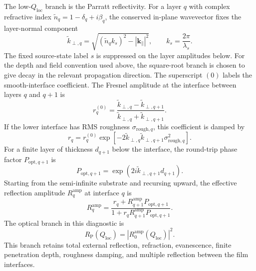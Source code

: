 The low-$Q_{\mathrm{loc}}$ branch is the Parratt reflectivity.\cite{Parratt1954} For a layer
$q$ with complex refractive index $\tilde n_q=1-\delta_q+i\beta_q$, the conserved
in-plane wavevector fixes the layer-normal component
\begin{equation}
  \widetilde k_{\perp,q}=\sqrt{(\tilde n_q k_s)^2-\left|\mathbf k_{\parallel}\right|^2},
  \qquad
  k_s=\frac{2\pi}{\lambda_s}.
  \label{eq:si_parratt_kz}
\end{equation}
The fixed source-state label $s$ is suppressed on the layer amplitudes below. For the depth and field convention used above, the square-root branch is chosen
to give decay in the relevant propagation direction.
The superscript $(0)$ labels the smooth-interface coefficient. The Fresnel amplitude at the interface between layers $q$ and $q+1$ is
\begin{equation}
  r_q^{(0)}=\frac{\widetilde k_{\perp,q}-\widetilde k_{\perp,q+1}}{\widetilde k_{\perp,q}+\widetilde k_{\perp,q+1}}.
  \label{eq:si_parratt_interface}
\end{equation}
If the lower interface has RMS roughness $\sigma_{\mathrm{rough},q}$, this coefficient is damped
by
\begin{equation}
  r_q=r_q^{(0)}\exp\!\left[-2\widetilde k_{\perp,q}\widetilde k_{\perp,q+1}\sigma_{\mathrm{rough},q}^2\right].
  \label{eq:si_parratt_roughness}
\end{equation}
For a finite layer of thickness $d_{q+1}$ below the interface, the round-trip
phase factor $P_{\mathrm{opt},q+1}$ is
\begin{equation}
  P_{\mathrm{opt},q+1}=\exp\!\left(2i\widetilde k_{\perp,q+1}d_{q+1}\right).
  \label{eq:si_parratt_phase}
\end{equation}
Starting from the semi-infinite substrate and recursing upward, the effective
reflection amplitude $R_q^{\mathrm{amp}}$ at interface $q$ is
\begin{equation}
  R_q^{\mathrm{amp}}
  =
  \frac{r_q+R_{q+1}^{\mathrm{amp}}P_{\mathrm{opt},q+1}}
       {1+r_qR_{q+1}^{\mathrm{amp}}P_{\mathrm{opt},q+1}}.
  \label{eq:si_parratt_recursion}
\end{equation}
The optical branch in this diagnostic is
\begin{equation}
  R_{\mathrm P}(Q_{\mathrm{loc}})=\left|R_0^{\mathrm{amp}}(Q_{\mathrm{loc}})\right|^2.
  \label{eq:si_parratt_reflectivity}
\end{equation}
This branch retains total external reflection, refraction, evanescence, finite
penetration depth, roughness damping, and multiple reflection between the film
interfaces.

